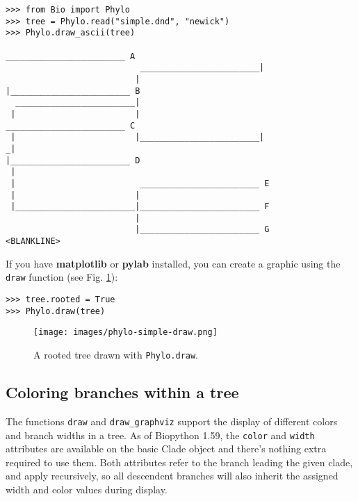 \documentclass{report}
\begin{document}
\begin{verbatim}
>>> from Bio import Phylo
>>> tree = Phylo.read("simple.dnd", "newick")
>>> Phylo.draw_ascii(tree)
                                                    ________________________ A
                           ________________________|
                          |                        |________________________ B
  ________________________|
 |                        |                         ________________________ C
 |                        |________________________|
_|                                                 |________________________ D
 |
 |                         ________________________ E
 |                        |
 |________________________|________________________ F
                          |
                          |________________________ G
<BLANKLINE>
\end{verbatim}

If you have \textbf{matplotlib} or \textbf{pylab} installed, you can create a graphic
using the \verb|draw| function (see Fig. \ref{fig:phylo-simple-draw}):

\begin{verbatim}
>>> tree.rooted = True
>>> Phylo.draw(tree)
\end{verbatim}

\begin{htmlonly}
\label{fig:phylo-simple-draw}
\end{htmlonly}

\begin{latexonly}
\begin{figure}[htb]
\centering
\texttt{[image: images/phylo-simple-draw.png]}
\caption{A rooted tree drawn with {\tt Phylo.draw}.}
\label{fig:phylo-simple-draw}
\end{figure}
\end{latexonly}


\subsection{Coloring branches within a tree}

The functions \verb|draw| and \verb|draw_graphviz| support the display of different
colors and branch widths in a tree.
As of Biopython 1.59, the \verb|color| and \verb|width| attributes are available on the
basic Clade object and there's nothing extra required to use them.
Both attributes refer to the branch leading the given clade, and apply recursively, so
all descendent branches will also inherit the assigned width and color values during
display.
\end{document}
